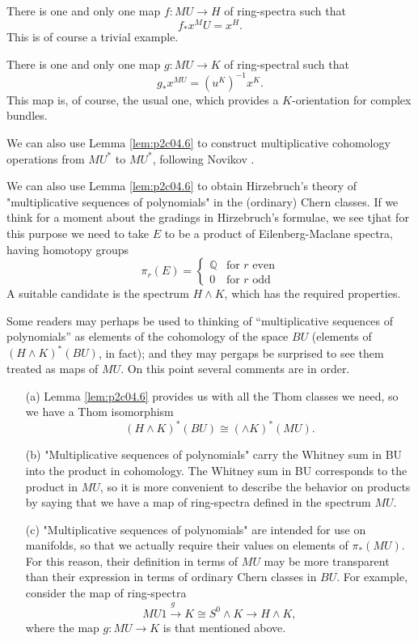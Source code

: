 \documentclass[../main]{subfiles}
\begin{document}
\begin{example}
There is one and only one map $f:MU\longrightarrow H$ of ring-spectra such that 
$$f_\ast x^MU=x^H.$$
This is of course a trivial example.
\end{example}
\begin{example}
There is one and only one map $g:MU\longrightarrow K$ of ring-spectral such that
$$g_\ast x^{MU}=\left(u^K\right)^{-1}x^K.$$
This map is, of course, the usual one, which provides a $K$-orientation for complex bundles.
\end{example}

We can also use Lemma \ref{lem:p2c04.6} to construct multiplicative cohomology operations from $MU^\ast$ to $MU^\ast$, following Novikov \cite{novikov}.

We can also use Lemma \ref{lem:p2c04.6} to obtain Hirzebruch's theory of "multiplicative sequences of polynomials" in the (ordinary) Chern classes. If we think for a moment about the gradings in Hirzebruch's formulae, we see tjhat for this purpose we need to take $E$ to be a product of Eilenberg-Maclane spectra, having homotopy groups
$$\pi_r(E)=\begin{cases}\mathbb{Q} & \text{for } r \text{ even} \\ 0 & \text{for } r \text{ odd}\end{cases}$$
A suitable candidate is the spectrum $H\wedge K$, which has the required properties.

Some readers may perhaps be used to thinking of ``multiplicative sequences of polynomials'' as elements of the cohomology of the space $BU$ (elements of $(H\wedge K)^\ast(BU)$, in fact); and they may pergaps be surprised to see them treated as maps of $MU$. On this point several comments are in order.
\begin{enumerate}
    \item[(a)] Lemma \ref{lem:p2c04.6} provides us with all the Thom classes we need, so we have a Thom isomorphism
    $$(H\wedge K)^\ast(BU)\cong (\wedge K)^\ast(MU).$$
    \item[(b)] "Multiplicative sequences of polynomials" carry the Whitney sum in BU into the product in cohomology. The Whitney sum in BU corresponds to the product in $MU$, so it is more convenient to describe the behavior on products by saying that we have a map of ring-spectra defined in the spectrum $MU$.
    \item[(c)] "Multiplicative sequences of polynomials" are intended for use on manifolds, so that we actually require their values on elements of $\pi_\ast(MU).$ For this reason, their definition in terms of $MU$ may be more transparent than their expression in terms of ordinary Chern classes in $BU$. For example, consider the map of ring-spectra
    $$MU\overset{g}{1\longrightarrow} K\cong S^0\wedge K \longrightarrow H\wedge K,$$
    where the map $g:MU\longrightarrow K$ is that mentioned above.
\end{enumerate}
\end{document}
